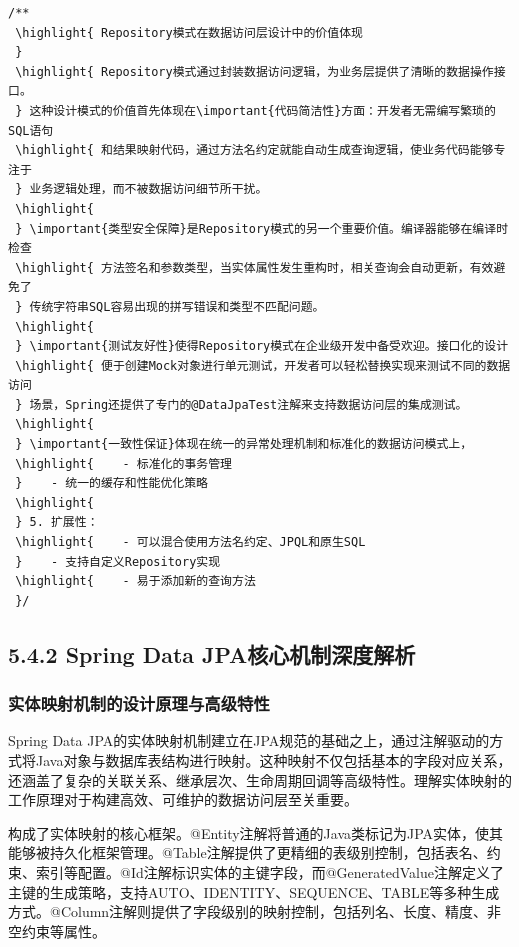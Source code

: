 \begin{lstlisting}[style=java]
/**
 \highlight{ Repository模式在数据访问层设计中的价值体现
 } 
 \highlight{ Repository模式通过封装数据访问逻辑，为业务层提供了清晰的数据操作接口。
 } 这种设计模式的价值首先体现在\important{代码简洁性}方面：开发者无需编写繁琐的SQL语句
 \highlight{ 和结果映射代码，通过方法名约定就能自动生成查询逻辑，使业务代码能够专注于
 } 业务逻辑处理，而不被数据访问细节所干扰。
 \highlight{ 
 } \important{类型安全保障}是Repository模式的另一个重要价值。编译器能够在编译时检查
 \highlight{ 方法签名和参数类型，当实体属性发生重构时，相关查询会自动更新，有效避免了
 } 传统字符串SQL容易出现的拼写错误和类型不匹配问题。
 \highlight{ 
 } \important{测试友好性}使得Repository模式在企业级开发中备受欢迎。接口化的设计
 \highlight{ 便于创建Mock对象进行单元测试，开发者可以轻松替换实现来测试不同的数据访问
 } 场景，Spring还提供了专门的@DataJpaTest注解来支持数据访问层的集成测试。
 \highlight{ 
 } \important{一致性保证}体现在统一的异常处理机制和标准化的数据访问模式上，
 \highlight{    - 标准化的事务管理
 }    - 统一的缓存和性能优化策略
 \highlight{ 
 } 5. 扩展性：
 \highlight{    - 可以混合使用方法名约定、JPQL和原生SQL
 }    - 支持自定义Repository实现
 \highlight{    - 易于添加新的查询方法
 }/
\end{lstlisting}

\hypertarget{spring-data-jpaux6838ux5fc3ux673aux5236ux6df1ux5ea6ux89e3ux6790}{%
\subsection{5.4.2 Spring Data JPA核心机制深度解析}\label{spring-data-jpaux6838ux5fc3ux673aux5236ux6df1ux5ea6ux89e3ux6790}}

\hypertarget{ux5b9eux4f53ux6620ux5c04ux673aux5236ux7684ux8bbeux8ba1ux539fux7406ux4e0eux9ad8ux7ea7ux7279ux6027}{%
\subsubsection{实体映射机制的设计原理与高级特性}\label{ux5b9eux4f53ux6620ux5c04ux673aux5236ux7684ux8bbeux8ba1ux539fux7406ux4e0eux9ad8ux7ea7ux7279ux6027}}

Spring Data JPA的实体映射机制建立在JPA规范的基础之上，通过注解驱动的方式将Java对象与数据库表结构进行映射。这种映射不仅包括基本的字段对应关系，还涵盖了复杂的关联关系、继承层次、生命周期回调等高级特性。理解实体映射的工作原理对于构建高效、可维护的数据访问层至关重要。

构成了实体映射的核心框架。@Entity注解将普通的Java类标记为JPA实体，使其能够被持久化框架管理。@Table注解提供了更精细的表级别控制，包括表名、约束、索引等配置。@Id注解标识实体的主键字段，而@GeneratedValue注解定义了主键的生成策略，支持AUTO、IDENTITY、SEQUENCE、TABLE等多种生成方式。@Column注解则提供了字段级别的映射控制，包括列名、长度、精度、非空约束等属性。

